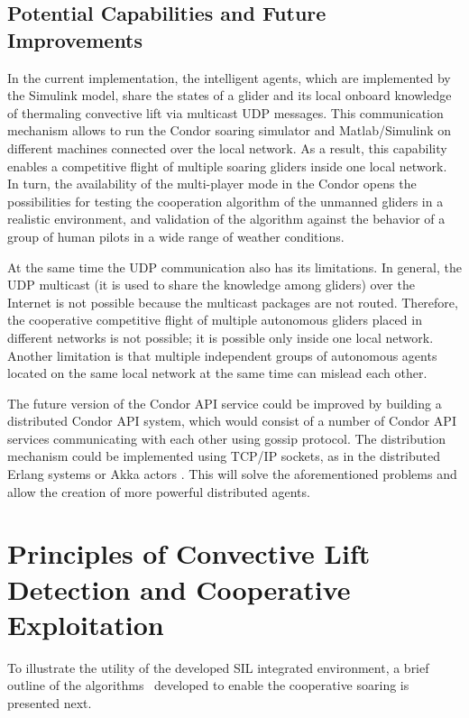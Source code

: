 \documentclass[letterpaper, 10 pt, conference]{ieeeconf}  %
\newcommand{\squeezeup}{\vspace{-1.0mm}}
\begin{document}
\subsection{Potential Capabilities and Future Improvements}
\squeezeup
In the current implementation, the intelligent agents, which are implemented by the Simulink model, share the states of a glider and its local onboard knowledge of thermaling convective lift via multicast UDP messages. This communication mechanism allows to run the Condor soaring simulator and Matlab/Simulink on different machines connected over the local network. As a result, this capability enables a competitive flight of multiple soaring gliders inside one local network. In turn, the availability of the multi-player mode in the Condor opens the possibilities for testing the cooperation algorithm of the unmanned gliders in a realistic environment, and validation of the algorithm against the behavior of a group of human pilots in a wide range of weather conditions.

At the same time the UDP communication also has its limitations. In general, the UDP multicast (it is used to share the knowledge among gliders) over the Internet is not possible because the multicast packages are not routed. Therefore, the cooperative competitive flight of multiple autonomous gliders placed in different networks is not possible; it is possible only inside one local network. Another limitation is that multiple independent groups of autonomous agents located on the same local network at the same time can mislead each other.

The future version of the Condor API service could be improved by building a distributed Condor API system, which would consist of a number of Condor API services communicating with each other using gossip protocol\cite{Gupta:2006}. The distribution mechanism could be implemented using TCP/IP sockets, as in the distributed Erlang systems \cite{Erlang:2013:Online} or Akka actors \cite{Akka:2013:Online}. This will solve the aforementioned problems and allow the creation of more powerful distributed agents.

\section{Principles of Convective Lift Detection and Cooperative Exploitation}
\squeezeup
To illustrate the utility of the developed SIL integrated environment, a brief outline of the algorithms~\cite{AKlass_JGCD:2012} developed to enable the cooperative soaring is presented next.
\end{document}
